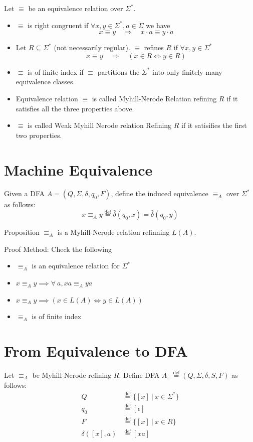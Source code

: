 \documentclass{report}
\newcommand{\dhat}{\hat{\delta}}
\begin{document}
Let $\equiv$ be an equivalence relation over $\Sigma^*$.
\begin{itemize}
  \item $\equiv$ is right congruent if $\forall x, y \in \Sigma^*, a \in \Sigma$ we have
        $$
          x \equiv y \quad \Rightarrow \quad x \cdot a \equiv y \cdot a
        $$
  \item Let $R \subseteq \Sigma^*$ (not necessarily regular). $\equiv$ refines $R$ if $\forall x, y \in \Sigma^*$
        $$
          x \equiv y \quad \Rightarrow \quad(x \in R \Leftrightarrow y \in R)
        $$
  \item $\equiv$ is of finite index if $\equiv$ partitions the $\Sigma^*$ into only finitely many equivalence classes.
  \item Equivalence relation $\equiv$ is called Myhill-Nerode Relation refining $R$ if it satisfies all the three properties above.
  \item $\equiv$ is called Weak Myhill Nerode relation Refining $R$ if it satisifies the first two properties.
\end{itemize}

\section{Machine Equivalence}

Given a DFA $A = (Q,\Sigma,\delta,q_0,F)$, define the induced equivalence $\equiv_A$ over $\Sigma^*$ as follows:
$$
  x \equiv_A y \overset{\text{def}}{=} \dhat(q_0,x) = \dhat(q_0,y)
$$

Proposition $\equiv_A$ is a Myhill-Nerode relation refinning $L(A)$.

Proof Method: Check the following
\begin{itemize}
  \item $\equiv_A$ is an equivalence relation for $\Sigma^*$
  \item $x\equiv_A y \implies \forall \ a, xa \equiv_A ya$
  \item $x\equiv_A y \implies (x \in L(A) \iff y \in L(A))$
  \item $\equiv_A$ is of finite index
\end{itemize}

\section{From Equivalence to DFA}

Let $\equiv_A$ be Myhill-Nerode refining $R$. Define DFA $A_{\equiv} \overset{\text{def}}{=} (Q,\Sigma,\delta,S,F)$ as follows:
\begin{align*}
  Q             & \overset{\text{def}}{=} \{ [x] \ | \ x \in \Sigma^* \} \\
  q_0           & \overset{\text{def}}{=} [\epsilon]                     \\
  F             & \overset{\text{def}}{=} \{ [x] \ | \ x \in R \}        \\
  \delta([x],a) & \overset{\text{def}}{=} [xa]
\end{align*}
\end{document}
